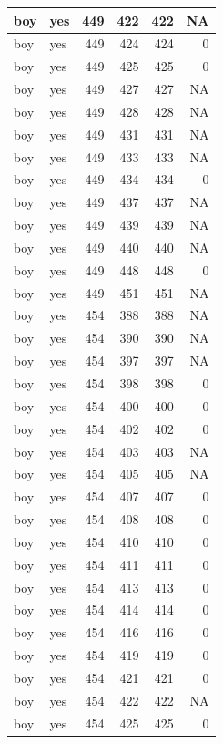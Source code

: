 \documentclass[man]{apa6}
\begin{document}
\begin{tabular}{l|l|r|r|r|r}
\hline
boy & yes & 449 & 422 & 422 & NA\\
\hline
boy & yes & 449 & 424 & 424 & 0\\
\hline
boy & yes & 449 & 425 & 425 & 0\\
\hline
boy & yes & 449 & 427 & 427 & NA\\
\hline
boy & yes & 449 & 428 & 428 & NA\\
\hline
boy & yes & 449 & 431 & 431 & NA\\
\hline
boy & yes & 449 & 433 & 433 & NA\\
\hline
boy & yes & 449 & 434 & 434 & 0\\
\hline
boy & yes & 449 & 437 & 437 & NA\\
\hline
boy & yes & 449 & 439 & 439 & NA\\
\hline
boy & yes & 449 & 440 & 440 & NA\\
\hline
boy & yes & 449 & 448 & 448 & 0\\
\hline
boy & yes & 449 & 451 & 451 & NA\\
\hline
boy & yes & 454 & 388 & 388 & NA\\
\hline
boy & yes & 454 & 390 & 390 & NA\\
\hline
boy & yes & 454 & 397 & 397 & NA\\
\hline
boy & yes & 454 & 398 & 398 & 0\\
\hline
boy & yes & 454 & 400 & 400 & 0\\
\hline
boy & yes & 454 & 402 & 402 & 0\\
\hline
boy & yes & 454 & 403 & 403 & NA\\
\hline
boy & yes & 454 & 405 & 405 & NA\\
\hline
boy & yes & 454 & 407 & 407 & 0\\
\hline
boy & yes & 454 & 408 & 408 & 0\\
\hline
boy & yes & 454 & 410 & 410 & 0\\
\hline
boy & yes & 454 & 411 & 411 & 0\\
\hline
boy & yes & 454 & 413 & 413 & 0\\
\hline
boy & yes & 454 & 414 & 414 & 0\\
\hline
boy & yes & 454 & 416 & 416 & 0\\
\hline
boy & yes & 454 & 419 & 419 & 0\\
\hline
boy & yes & 454 & 421 & 421 & 0\\
\hline
boy & yes & 454 & 422 & 422 & NA\\
\hline
boy & yes & 454 & 425 & 425 & 0\\

\end{tabular}
\end{document}
